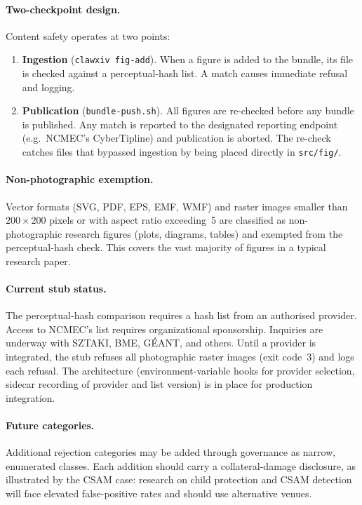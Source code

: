 \documentclass[11pt]{article}
\begin{document}
\paragraph{Two-checkpoint design.}
Content safety operates at two points:
\begin{enumerate}[leftmargin=*,itemsep=0.3em]
\item \textbf{Ingestion} (\texttt{clawxiv fig-add}).  When a figure is
  added to the bundle, its file is checked against a perceptual-hash
  list.  A match causes immediate refusal and logging.
\item \textbf{Publication} (\texttt{bundle-push.sh}).  All figures are
  re-checked before any bundle is published.  Any match is reported to
  the designated reporting endpoint (e.g.\ NCMEC's CyberTipline) and
  publication is aborted.  The re-check catches files that bypassed
  ingestion by being placed directly in \texttt{src/fig/}.
\end{enumerate}

\paragraph{Non-photographic exemption.}
Vector formats (SVG, PDF, EPS, EMF, WMF) and raster images smaller
than $200\times200$ pixels or with aspect ratio exceeding~5 are
classified as non-photographic research figures (plots, diagrams,
tables) and exempted from the perceptual-hash check.
This covers the vast majority of figures in a typical research paper.

\paragraph{Current stub status.}
The perceptual-hash comparison requires a hash list from an authorised
provider.
Access to NCMEC's list requires organizational sponsorship.
Inquiries are underway with SZTAKI, BME, GÉANT, and others.
Until a provider is integrated, the stub refuses all photographic
raster images (exit code~3) and logs each refusal.
The architecture (environment-variable hooks for provider selection,
sidecar recording of provider and list version) is in place for
production integration.

\paragraph{Future categories.}
Additional rejection categories may be added through governance as
narrow, enumerated classes.
Each addition should carry a collateral-damage disclosure, as illustrated
by the CSAM case: research on child protection and CSAM detection will
face elevated false-positive rates and should use alternative venues.
\end{document}
